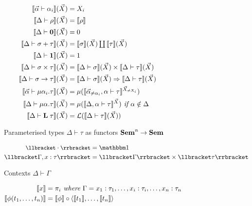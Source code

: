 \begin{figure}
\begin{subfigure}{\linewidth}
  \begin{align*}
  \small
  \llbracket \vec\alpha \vdash \alpha_i \rrbracket(\vec X) &=
  X_i
  \\
  \llbracket \Delta \vdash \rho \rrbracket(\vec X) &=
  \llbracket \rho \rrbracket
  \\
  \llbracket \Delta \vdash \mathbf{0} \rrbracket(\vec X) &=
  0
  \\
  \llbracket \Delta \vdash \sigma + \tau \rrbracket(\vec X) &=
  \textstyle {\llbracket \sigma \rrbracket(\vec X)} \coprod {\llbracket \tau \rrbracket(\vec X)}
  \\
  \llbracket \Delta \vdash \mathbf{1} \rrbracket(\vec X) &=
  1
  \\
  \llbracket \Delta \vdash \sigma \times \tau \rrbracket(\vec X) &=
  \llbracket \Delta \vdash \sigma \rrbracket(\vec X) \times \llbracket \Delta \vdash \tau \rrbracket(\vec X)
  \\
  \llbracket \Delta \vdash \sigma \to \tau \rrbracket(\vec X) &=
  \llbracket \Delta \vdash \sigma \rrbracket(\vec X) \Rightarrow \llbracket \Delta \vdash \tau \rrbracket(\vec X)
  \\
  \llbracket \vec\alpha \vdash \mu\alpha_i.\tau \rrbracket(\vec X) &=
  \mu(\llbracket \vec\alpha_{\neq \alpha_i}, \alpha \vdash \tau \rrbracket^{\vec X_{\neq X_i}})
  \\
  \llbracket \Delta \vdash \mu\alpha.\tau \rrbracket(\vec X) &=
  \mu(\llbracket \Delta, \alpha \vdash \tau \rrbracket^{\vec X})
  \textit{ if }\alpha \notin \Delta
  \\
  \llbracket \Delta \vdash \mathbf{L}\;\tau \rrbracket(\vec X) &=
  \mathcal{L}(\llbracket \Delta \vdash \tau \rrbracket(\vec X))
  \end{align*}
  \caption{Parameterised types $\Delta \vdash \tau$ as functors $\mathbf{Sem}^n \to \mathbf{Sem}$ }
  \label{fig:default-semantics:types}
\end{subfigure}
\begin{subfigure}{\linewidth}
  \begin{align*}
  \small
  \sem{\emptyCxt} &= \One
  \\
  \sem{\Gamma, x: \tau} &= \sem{\Gamma} \times \sem{\tau}
  \end{align*}
  \caption{Contexts $\Delta \vdash \Gamma$}
\end{subfigure}
\begin{subfigure}{\linewidth}
  \begin{align*}
  \small
  \sem{x} &= \pi_i
  \textit{ where }\Gamma = x_1: \tau_1, \ldots, x_i: \tau_i, \ldots, x_n: \tau_n
  \\
  \sem{\phi(t_1, \ldots, t_n)}
  &=
  \sem{\phi} \comp \prodM{\sem{t_1}}{\ldots, \sem{t_n}}

\end{align*}
\end{subfigure}
\end{figure}
